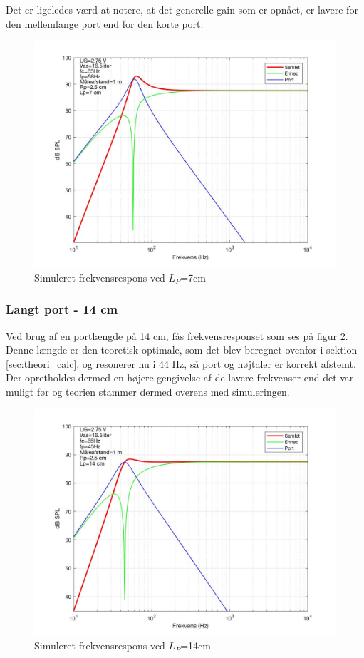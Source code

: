 Det er ligeledes værd at notere, at det generelle gain som er opnået, er lavere for den mellemlange port end for den korte port.  

\begin{figure}[h!]
	\centering
	\includegraphics[width=.75\textwidth]{Pics/sim_medium}
	\caption{Simuleret frekvensrespons ved $L_P$=7cm } 
	\label{fig:sim_medium}
\end{figure}

\subsubsection{Langt port - 14 cm}

Ved brug af en portlængde på 14 cm, fås frekvensresponset som ses på figur \ref{fig:sim_langt}. \\
Denne længde er den teoretisk optimale, som det blev beregnet ovenfor i sektion \ref{sec:theori_calc}, og resonerer nu i 44 Hz, så port og højtaler er korrekt afstemt. 
Der opretholdes dermed en højere gengivelse af de lavere frekvenser end det var muligt før og teorien stammer dermed overens med simuleringen. 

\begin{figure}[h!]
	\centering
	\includegraphics[width=.75\textwidth]{Pics/sim_lang}
	\caption{Simuleret frekvensrespons ved $L_P$=14cm } 
	\label{fig:sim_langt}
\end{figure}


